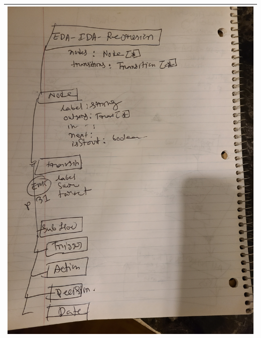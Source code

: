 \begin{tabular}{|c|}
\includegraphics[scale=0.1, angle = -90]{sketch/8.jpg} \\
\hline
\end{tabular}
